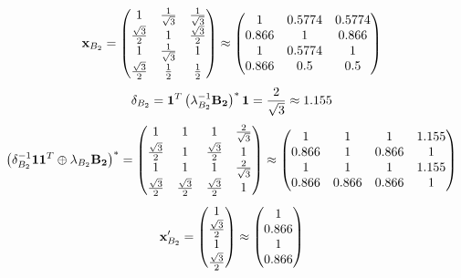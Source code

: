 \documentclass[10pt,a4paper]{article}
\begin{document}
	\[
		\bold{x}_{B_2} = 
		\begin{pmatrix}
			{1} {} & \frac{1} {\sqrt{3}} & \frac{1} {\sqrt{3}} \\
			\frac{\sqrt{3}} {{2}} & {1} {} & \frac{\sqrt{3}} {{2}} \\
			{1} {} & \frac{1} {\sqrt{3}} & {1} {} \\
			\frac{\sqrt{3}} {{2}} & \frac{1} {{2}} & \frac{1} {{2}} \\
		\end{pmatrix}
		\approx
		\begin{pmatrix}
			1        & 0.5774   & 0.5774   \\
			0.866    & 1        & 0.866    \\
			1        & 0.5774   & 1        \\
			0.866    & 0.5      & 0.5      \\
		\end{pmatrix}
	\]
	\[
		\delta_{B_2} = \bold{1}^T \left(\lambda_{B_2}^{-1}\bold{B_2}\right)^* \bold{1} = \frac{{2}} {\sqrt{3}}\approx 1.155
	\]
	\[
		\left(\delta_{B_2}^{-1}\bold{11}^T \oplus \lambda_{B_2}\bold{B_2}\right)^* = 
		\begin{pmatrix}
			{1} {} & {1} {} & {1} {} & \frac{{2}} {\sqrt{3}} \\
			\frac{\sqrt{3}} {{2}} & {1} {} & \frac{\sqrt{3}} {{2}} & {1} {} \\
			{1} {} & {1} {} & {1} {} & \frac{{2}} {\sqrt{3}} \\
			\frac{\sqrt{3}} {{2}} & \frac{\sqrt{3}} {{2}} & \frac{\sqrt{3}} {{2}} & {1} {} \\
		\end{pmatrix}
		\approx
		\begin{pmatrix}
			1        & 1        & 1        & 1.155    \\
			0.866    & 1        & 0.866    & 1        \\
			1        & 1        & 1        & 1.155    \\
			0.866    & 0.866    & 0.866    & 1        \\
		\end{pmatrix}
	\]
	\[
		\bold{x}'_{B_2} = 
		\begin{pmatrix}
			{1} {} \\
			\frac{\sqrt{3}} {{2}} \\
			{1} {} \\
			\frac{\sqrt{3}} {{2}} \\
		\end{pmatrix}
		\approx
		\begin{pmatrix}
			1        \\
			0.866    \\
			1        \\
			0.866    \\
		\end{pmatrix}
	\]
\end{document}
